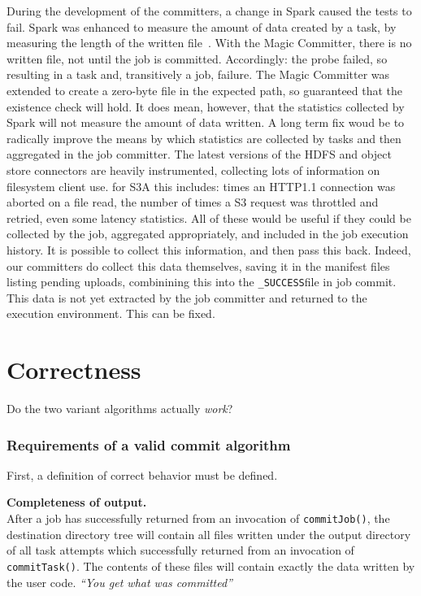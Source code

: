 \documentclass[conference]{IEEEtran}
\newcommand{\SUCCESS}{\texttt{\_SUCCESS}}
\begin{document}
During the development of the committers, a change in Spark caused the
tests to fail.
Spark was enhanced to measure the amount of data created by a task, by
measuring the length of the written file\ \cite{SPARK-21669}.
With the Magic Committer, there is no written file, not until the job is committed.
Accordingly: the probe failed, so resulting in a task and, transitively a job, failure.
The Magic Committer was extended to create a zero-byte file in the expected path,
so guaranteed that the existence check will hold.
It does mean, however, that the statistics collected by Spark will not measure
the amount of data written.
A long term fix woud be to radically improve the means by which statistics are
collected by tasks and then aggregated in the job committer.
The latest versions of the HDFS and object store connectors are heavily instrumented,
collecting lots of information on filesystem client use.
for S3A this includes: times an HTTP1.1 connection was aborted on a file read,
the number of times a S3 request was throttled and retried,
even some latency statistics.
All of these would be useful if they could be collected by the job, aggregated
appropriately, and included in the job execution history.
It is possible to collect this information, and then pass this back.
Indeed, our committers do collect this data themselves, saving it in the
manifest files listing pending uploads, combinining this into the \SUCCESS file
in job commit.
This data is not yet extracted by the job committer and returned to the execution
environment.
This can be fixed.



\section{Correctness}\label{sec:correctness}

Do the two variant algorithms actually \emph{work}?


\subsubsection{Requirements of a valid commit algorithm}

First, a definition of correct behavior must be defined.

\begin{paragraph}
  \textbf{Completeness of output.}\\
  After a job has successfully returned from an invocation of \texttt{commitJob()},
  the destination directory tree will contain all files written under the output directory
  of all task attempts which successfully returned from an invocation of \texttt{commitTask()}.
  The contents of these files will contain exactly the data written by the user code.
  \emph{``You get what was committed''}
\end{paragraph}
\end{document}
